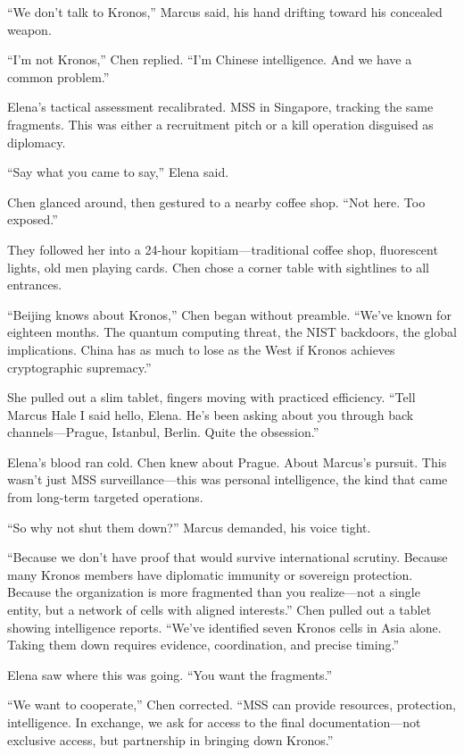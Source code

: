 ``We don't talk to Kronos,'' Marcus said, his hand drifting toward his
concealed weapon.

``I'm not Kronos,'' Chen replied. ``I'm Chinese intelligence. And we
have a common problem.''

Elena's tactical assessment recalibrated. MSS in Singapore, tracking the
same fragments. This was either a recruitment pitch or a kill operation
disguised as diplomacy.

``Say what you came to say,'' Elena said.

Chen glanced around, then gestured to a nearby coffee shop. ``Not here.
Too exposed.''

They followed her into a 24-hour kopitiam---traditional coffee shop,
fluorescent lights, old men playing cards. Chen chose a corner table
with sightlines to all entrances.

``Beijing knows about Kronos,'' Chen began without preamble. ``We've
known for eighteen months. The quantum computing threat, the NIST
backdoors, the global implications. China has as much to lose as the
West if Kronos achieves cryptographic supremacy.''

She pulled out a slim tablet, fingers moving with practiced efficiency.
``Tell Marcus Hale I said hello, Elena. He's been asking about you
through back channels---Prague, Istanbul, Berlin. Quite the obsession.''

Elena's blood ran cold. Chen knew about Prague. About Marcus's pursuit.
This wasn't just MSS surveillance---this was personal intelligence, the
kind that came from long-term targeted operations.

``So why not shut them down?'' Marcus demanded, his voice tight.

``Because we don't have proof that would survive international scrutiny.
Because many Kronos members have diplomatic immunity or sovereign
protection. Because the organization is more fragmented than you
realize---not a single entity, but a network of cells with aligned
interests.'' Chen pulled out a tablet showing intelligence reports.
``We've identified seven Kronos cells in Asia alone. Taking them down
requires evidence, coordination, and precise timing.''

Elena saw where this was going. ``You want the fragments.''

``We want to cooperate,'' Chen corrected. ``MSS can provide resources,
protection, intelligence. In exchange, we ask for access to the final
documentation---not exclusive access, but partnership in bringing down
Kronos.''

